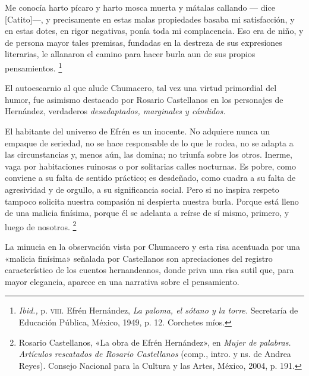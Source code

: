 \documentclass[14pt,twoside,final]{extbook} %
\let\oldfootnote\footnote
\renewcommand\footnote[1]{%
\oldfootnote{\hspace{1mm}#1}}
\begin{document}
\begin{quoting}
Me conocía harto pícaro y harto mosca muerta y mátalas callando --- dice [Catito]---, y precisamente en estas malas propiedades basaba mi satisfacción, y en estas dotes, en rigor negativas, ponía toda mi complacencia. Eso era de niño, y de persona mayor tales premisas, fundadas en la destreza de sus expresiones literarias, le allanaron el camino para hacer burla aun de sus propios pensamientos.\footnote{\emph{Ibid.,} p. \textsc{viii}. Efrén Hernández, \emph{La paloma, el sótano y la torre.} Secretaría de Educación Pública, México, 1949, p. 12. Corchetes míos.}
\end{quoting}
El autoescarnio al que alude Chumacero, tal vez una virtud primordial del humor, fue asimismo destacado por Rosario Castellanos en los personajes de Hernández, verdaderos \emph{desadaptados, marginales y cándidos.}
\begin{quoting}
El habitante del universo de Efrén es un inocente. No adquiere nunca un empaque de seriedad, no se hace responsable de lo que le rodea, no se adapta a las circunstancias y, menos aún, las domina; no
triunfa sobre los otros. Inerme, vaga por habitaciones ruinosas o por solitarias calles nocturnas. Es pobre, como conviene a su falta de sentido práctico; es desdeñado, como cuadra a su falta de agresividad y de orgullo, a su significancia social. Pero si no inspira respeto tampoco solicita nuestra compasión ni despierta nuestra burla. Porque está lleno de una malicia finísima, porque él se
adelanta a reírse de sí mismo, primero, y luego de nosotros.\footnote{Rosario Castellanos, «La obra de Efrén Hernández», en \emph{Mujer de palabras. Artículos rescatados de Rosario Castellanos} (comp., intro. y ns. de Andrea Reyes). Consejo Nacional para la Cultura y las Artes, México,
2004, p. 191.}
\end{quoting}
La minucia en la observación vista por Chumacero y esta risa acentuada por una «malicia finísima» señalada por Castellanos son apreciaciones del registro característico de los cuentos hernandeanos, donde priva una risa sutil que, para mayor elegancia, aparece en una narrativa sobre el pensamiento.
\end{document}
